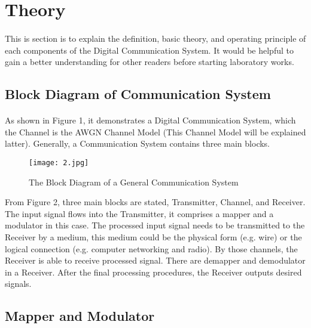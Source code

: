 \documentclass[12pt]{article}
\begin{document}
    
    \section{Theory}
    \paragraph{}
    This is section is to explain the definition, basic theory, and operating principle of each components of the Digital Communication System. It would be helpful to gain a better understanding for other readers before starting laboratory works.
    \subsection{Block Diagram of Communication System}
    \paragraph{}
    As shown in Figure 1, it demonstrates a Digital Communication System, which the Channel is the AWGN Channel Model (This Channel Model will be explained latter). Generally, a Communication System contains three main blocks.
    \begin{figure}[H]
    \centering
    \texttt{[image: 2.jpg]}
    \caption{The Block Diagram of a General Communication System}
    \end{figure}
    From Figure 2, three main blocks are stated, Transmitter, Channel, and Receiver. The input signal flows into the Transmitter, it comprises a mapper and a modulator in this case. The processed input signal needs to be transmitted to the Receiver by a medium, this medium could be the physical form (e.g. wire) or the logical connection (e.g. computer networking and radio)\cite{1}. By those channels, the Receiver is able to receive processed signal. There are demapper and demodulator in a Receiver. After the final processing procedures, the Receiver outputs desired signals.   
    
    \subsection{Mapper and Modulator}
    \paragraph{}
    
\end{document}
